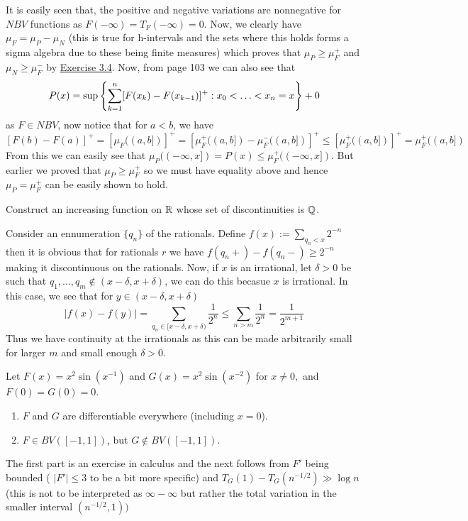 \documentclass[12pt,a4paper]{article}
\begin{document}
\begin{solution}
It is easily seen that, the positive and negative variations are nonnegative for $NBV$ functions as $F(-\infty)=T_F(-\infty)=0.$ 
Now, we clearly have $\mu_F=\mu_{P}-\mu_{N}$ (this is true for h-intervals and the sets where this holds forms a sigma algebra due to these being finite measures) which proves that $\mu_P\geq\mu_F^+$ and $\mu_N\geq\mu_F^-$ by \hyperref[prob:3-4]{Exercise 3.4}. 
Now, from page 103 we can also see that
\[
    P(x)=\sup\qty{\sum_{k=1}^n[F(x_k)-F(x_{k-1})]^+:x_0<\ldots<x_n=x} + 0
\]
as $F\in NBV$, now notice that for $a<b$, we have 
\[
    [F(b)-F(a)]^+=[\mu_F((a,b])]^+=[\mu_F^+((a,b])-\mu_F^-((a,b])]^+\leq[\mu_F^+((a,b])]^+=\mu_F^+((a,b])
\]
From this we can easily see that $\mu_P((-\infty,x])=P(x)\leq\mu_F^+((-\infty,x])$. 
But earlier we proved that $\mu_P\geq\mu_F^+$ so we must have equality above and hence $\mu_P=\mu_F^+$ can be easily shown to hold. 
\end{solution}
\begin{problem}\label{prob:3-30}
Construct an increasing function on $\mathbb{R}$ whose set of discontinuities is $\mathbb{Q}$.
\end{problem}
\begin{solution}
    Consider an ennumeration $\{q_n\}$ of the rationals. 
    Define $f(x):=\sum_{q_n<x}2^{-n}$ then it is obvious that for rationals $r$ we have $f(q_n+)-f(q_n-)\geq 2^{-n}$ making it discontinuous on the rationals. 
    Now, if $x$ is an irrational, let $\delta>0$ be such that $q_1,\ldots,q_m\not\in(x-\delta,x+\delta)$, we can do this becasue $x$ is irrational. 
    In this case, we see that for $y\in(x-\delta,x+\delta)$
    \[
        |f(x)-f(y)|=\sum_{q_n\in[x-\delta,x+\delta)}\frac1{2^n}\leq\sum_{n>m}\frac1{2^n}=\frac1{2^{m+1}}
    \]
    Thus we have continuity at the irrationals as this can be made arbitrarily small for larger $m$ and small enough $\delta>0.$
\end{solution}
\begin{problem}\label{prob:3-31}
Let $F(x)=x^{2}\sin(x^{-1})$ and $G(x)=x^{2}\sin(x^{-2})$ for $x\ne0,$ and $F(0)=G(0)=0$.
\begin{enumerate}[label=\alph*.]
    \item $F$ and $G$ are differentiable everywhere (including $x=0$).
    \item $F\in BV([-1,1])$, but $G\notin BV([-1,1])$.
\end{enumerate}
\end{problem}
\begin{solution}
    The first part is an exercise in calculus and the next follows from $F'$ being bounded ( $|F'|\leq3$ to be a bit more specific) and $T_G(1)-T_G(n^{-1/2})\gg\log n$ (this is not to be interpreted as $\infty-\infty$ but rather the total variation in the smaller interval $(n^{-1/2},1) )$
\end{solution}
\end{document}

